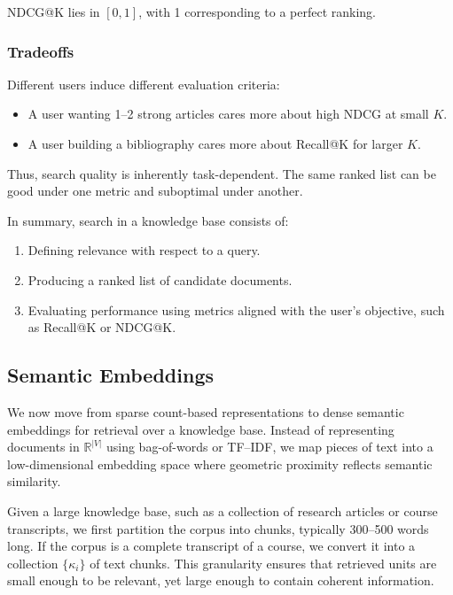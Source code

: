 NDCG@K lies in $[0,1]$, with 1 corresponding to a perfect ranking.

\bigskip

\subsubsection{Tradeoffs}

\medskip

Different users induce different evaluation criteria:

\begin{itemize}
    \item A user wanting 1--2 strong articles cares more about high NDCG at small $K$.
    \item A user building a bibliography cares more about Recall@K for larger $K$.
\end{itemize}

Thus, search quality is inherently task-dependent. The same ranked list can be good under one metric and suboptimal under another.

\medskip

In summary, search in a knowledge base consists of:
\begin{enumerate}
    \item Defining relevance with respect to a query.
    \item Producing a ranked list of candidate documents.
    \item Evaluating performance using metrics aligned with the user's objective, such as Recall@K or NDCG@K.
\end{enumerate}

\bigskip

\subsection{Semantic Embeddings}

\medskip

We now move from sparse count-based representations to dense semantic embeddings for retrieval over a knowledge base. Instead of representing documents in $\mathbb{R}^{|V|}$ using bag-of-words or TF--IDF, we map pieces of text into a low-dimensional embedding space where geometric proximity reflects semantic similarity.

Given a large knowledge base, such as a collection of research articles or course transcripts, we first partition the corpus into chunks, typically 300--500 words long. If the corpus is a complete transcript of a course, we convert it into a collection $\{\kappa_i\}$ of text chunks. This granularity ensures that retrieved units are small enough to be relevant, yet large enough to contain coherent information.

